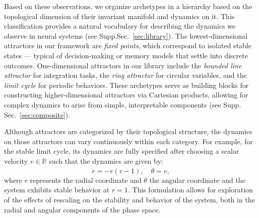 \documentclass{article}
\theoremstyle{definition} \newtheorem{definition}{Definition}  \newtheorem{example}{Example}
\theoremstyle{remark} \newtheorem{remark}{Remark}
\newcounter{ct}
\newcommand{\field}[1]{\ensuremath{\mathbb{#1}}}
\newcommand{\reals}{\field{R}}
\begin{document}
Based on these observations, we organize archetypes in a hierarchy based on the topological dimension of their invariant manifold and dynamics on it.
This classification provides a natural vocabulary for describing the dynamics we observe in neural systems (see Supp.Sec.~\ref{sec:library}). 
The lowest-dimensional attractors in our framework are \emph{fixed points}, which correspond to isolated stable states — typical of decision-making or memory models that settle into discrete outcomes.
One-dimensional attractors in our library include the \emph{bounded line attractor} for integration tasks, the \emph{ring attractor} for circular variables, and the \emph{limit cycle} for periodic behaviors.
These archetypes serve as building blocks for constructing higher-dimensional attractors via Cartesian products, allowing for complex dynamics to arise from simple, interpretable components (see Supp. Sec.~\ref{sec:composite}).

Although attractors are categorized by their topological structure, the dynamics on those attractors can vary continuously within each category. For example, for the stable limit cycle, its dynamics are fully specified after choosing a scalar velocity $v\in \reals$ such that the dynamics are given by:
\begin{equation}
\dot{r} =  -r (r - 1), %
\quad \dot{\theta} = v,
\end{equation}
where \( r \) represents the radial coordinate and \( \theta \) the angular coordinate and the system exhibits stable behavior at \( r = 1 \). This formulation allows for exploration of the effects of rescaling on the stability and behavior of the system, both in the radial and angular components of the phase space.
\end{document}
